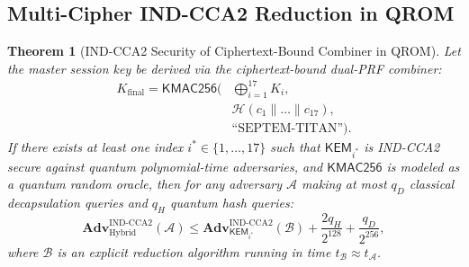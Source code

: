 \documentclass{ieeeaccess}
\newcommand{\Adv}{\mathbf{Adv}}
\newcommand{\calA}{\mathcal{A}}
\newcommand{\calB}{\mathcal{B}}
\newtheorem{theorem}{Theorem}
\begin{document}
\subsection{Multi-Cipher IND-CCA2 Reduction in QROM}
\begin{theorem}[IND-CCA2 Security of Ciphertext-Bound Combiner in QROM]
\label{thm:hybrid-cca}
Let the master session key be derived via the ciphertext-bound dual-PRF combiner:
\begin{equation}
\begin{aligned}
  K_{\mathrm{final}} = \mathsf{KMAC256}\Big(
    &\bigoplus_{i=1}^{17} K_i, \\
    &\mathcal{H}(c_1 \parallel \dots \parallel c_{17}), \\
    &\text{``SEPTEM-TITAN''}\Big).
\end{aligned}
\end{equation}
If there exists at least one index $i^* \in \{1, \dots, 17\}$ such that $\mathsf{KEM}_{i^*}$ is IND-CCA2 secure against quantum polynomial-time adversaries, and $\mathsf{KMAC256}$ is modeled as a quantum random oracle, then for any adversary $\calA$ making at most $q_D$ classical decapsulation queries and $q_H$ quantum hash queries:
\begin{equation}
  \Adv_{\mathrm{Hybrid}}^{\mathrm{IND\text{-}CCA2}}(\calA) \leq \Adv_{\mathsf{KEM}_{i^*}}^{\mathrm{IND\text{-}CCA2}}(\calB) + \frac{2 q_H}{2^{128}} + \frac{q_D}{2^{256}},
\end{equation}
where $\calB$ is an explicit reduction algorithm running in time $t_\calB \approx t_\calA$.
\end{theorem}
\end{document}
